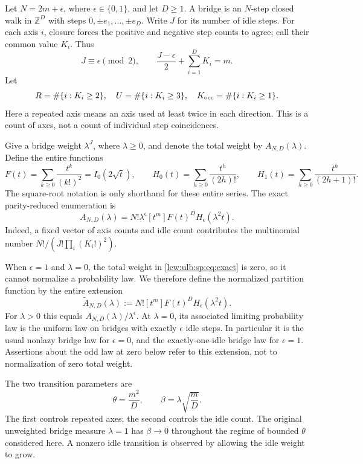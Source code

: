 \documentclass[11pt,letterpaper]{article}
\theoremstyle{remark}\newtheorem{remark}[theorem]{Remark}
\begin{document}
Let $N=2m+\epsilon$, where $\epsilon\in\{0,1\}$, and let $D\geq1$.
A bridge is an $N$-step closed walk in $\mathbb Z^D$ with steps
$0,\pm e_1,\ldots,\pm e_D$. Write $J$ for its number of idle steps.
For each axis $i$, closure forces the positive and negative step counts
to agree; call their common value $K_i$. Thus
\[
 J\equiv\epsilon\pmod2,\qquad
 \frac{J-\epsilon}{2}+\sum_{i=1}^D K_i=m.
\]
Let
\[
 R=\#\{i:K_i\geq2\},\quad U=\#\{i:K_i\geq3\},\quad
 K_{\rm occ}=\#\{i:K_i\geq1\}.
\]
Here a repeated axis means an axis used at least twice in each direction.
This is a count of axes, not a count of individual step coincidences.

Give a bridge weight $\lambda^J$, where $\lambda\geq0$, and denote the
total weight by $A_{N,D}(\lambda)$. Define the entire functions
\[
 F(t)=\sum_{k\geq0}\frac{t^k}{(k!)^2}=I_0(2\sqrt t),\qquad
 H_0(t)=\sum_{h\geq0}\frac{t^h}{(2h)!},\qquad
 H_1(t)=\sum_{h\geq0}\frac{t^h}{(2h+1)!}.
\]
The square-root notation is only shorthand for these entire series.
The exact parity-reduced enumeration is
\begin{equation}\label{lcw:ulb:sp:eq:exact}
 A_{N,D}(\lambda)
 =N!\lambda^\epsilon[t^m]F(t)^D H_\epsilon(\lambda^2t).
\end{equation}
Indeed, a fixed vector of axis counts and idle count contributes the
multinomial number $N!/(J!\prod_i(K_i!)^2)$.

When $\epsilon=1$ and $\lambda=0$, the total weight in
\eqref{lcw:ulb:sp:eq:exact} is zero, so it cannot normalize a probability law.
We therefore define the normalized partition function by the entire
extension
\[
 \widetilde A_{N,D}(\lambda)
 :=N![t^m]F(t)^D H_\epsilon(\lambda^2t).
\]
For $\lambda>0$ this equals $A_{N,D}(\lambda)/\lambda^\epsilon$.
At $\lambda=0$, its associated limiting probability law is the uniform
law on bridges with exactly $\epsilon$ idle steps. In particular it is
the usual nonlazy bridge law for $\epsilon=0$, and the exactly-one-idle
bridge law for $\epsilon=1$. Assertions about the odd law at zero below
refer to this extension, not to normalization of zero total weight.

The two transition parameters are
\[
 \theta=\frac{m^2}{D},\qquad
 \beta=\lambda\sqrt{\frac mD}.
\]
The first controls repeated axes; the second controls the idle count.
The original unweighted bridge measure $\lambda=1$ has $\beta\to0$
throughout the regime of bounded $\theta$ considered here. A nonzero
idle transition is observed by allowing the idle weight to grow.
\end{document}
